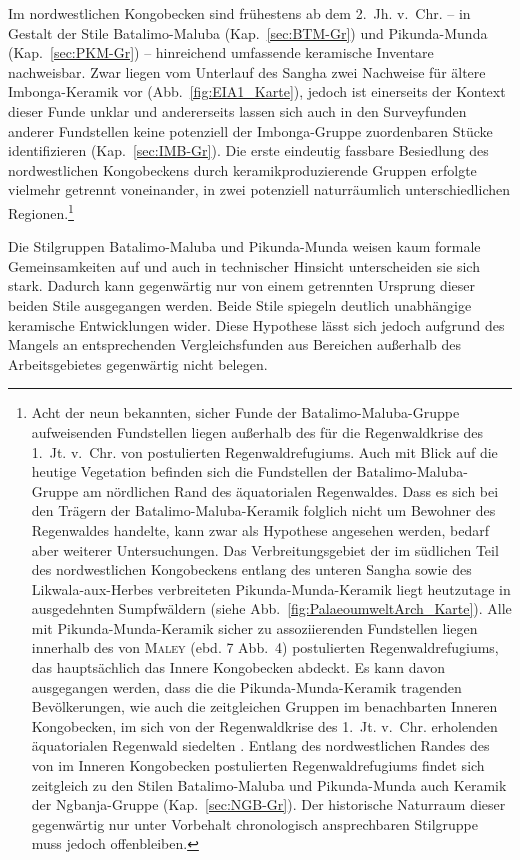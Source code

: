 Im nordwestlichen Kongobecken sind frühestens ab dem 2.~Jh. v.~Chr. -- in Gestalt der Stile Batalimo-Maluba (Kap.~\ref{sec:BTM-Gr}) und Pikunda-Munda (Kap.~\ref{sec:PKM-Gr}) -- hinreichend umfassende keramische Inventare nachweisbar. Zwar liegen vom Unterlauf des \mbox{Sangha} zwei Nachweise für ältere Imbonga-Keramik vor (Abb.~\ref{fig:EIA1_Karte}), jedoch ist einerseits der Kontext dieser Funde unklar und andererseits lassen sich auch in den Surveyfunden anderer Fundstellen keine potenziell der Imbonga-Gruppe zuordenbaren Stücke identifizieren (Kap.~\ref{sec:IMB-Gr}). Die erste eindeutig fassbare Besiedlung des nordwestlichen Kongobeckens durch keramikproduzierende Gruppen erfolgte vielmehr getrennt voneinander, in zwei potenziell naturräumlich unterschiedlichen Regionen.\footnote{Acht der neun bekannten, sicher Funde der Batalimo-Maluba-Gruppe aufweisenden Fundstellen liegen außerhalb des für die Regenwaldkrise des 1.~Jt. v.~Chr. von \textcite[7 Abb.~4]{Maley.2001} postulierten Regenwaldrefugiums. Auch mit Blick auf die heutige Vegetation befinden sich die Fundstellen der Batalimo-Maluba-Gruppe am nördlichen Rand des äquatorialen Regenwaldes. Dass es sich bei den Trägern der Batalimo-Maluba-Keramik folglich nicht um Bewohner des Regenwaldes handelte, kann zwar als Hypothese angesehen werden, bedarf aber weiterer Untersuchungen. Das Verbreitungsgebiet der im südlichen Teil des nordwestlichen Kongobeckens entlang des unteren \mbox{Sangha} sowie des \mbox{Likwala}-\mbox{aux}-\mbox{Herbes} verbreiteten Pikunda-Munda-Keramik liegt heutzutage in ausgedehnten Sumpfwäldern (siehe Abb.~\ref{fig:PalaeoumweltArch_Karte}). Alle mit Pikunda-Munda-Keramik sicher zu assoziierenden Fundstellen liegen innerhalb des von \textsc{Maley} (ebd. 7 Abb.~4) postulierten Regenwaldrefugiums, das hauptsächlich das Innere Kongobecken abdeckt. Es kann davon ausgegangen werden, dass die die Pikunda-Munda-Keramik tragenden Bevölkerungen, wie auch die zeitgleichen Gruppen im benachbarten Inneren Kongobecken, im sich von der Regenwaldkrise des 1.~Jt. v.~Chr. erholenden äquatorialen Regenwald siedelten \parencite[siehe][337]{Hubau.2013}. Entlang des nordwestlichen Randes des von \textcite{Maley.2001} im Inneren Kongobecken postulierten Regenwaldrefugiums findet sich zeitgleich zu den Stilen Batalimo-Maluba und Pikunda-Munda auch Keramik der \mbox{Ngbanja}-Gruppe (Kap.~\ref{sec:NGB-Gr}). Der historische Naturraum dieser gegenwärtig nur unter Vorbehalt chronologisch ansprechbaren Stilgruppe muss jedoch offenbleiben.}

Die Stilgruppen Batalimo-Maluba und Pikunda-Munda weisen kaum formale Gemeinsamkeiten auf und auch in technischer Hinsicht unterscheiden sie sich stark. Dadurch kann gegenwärtig nur von einem getrennten Ursprung dieser beiden Stile ausgegangen werden. Beide Stile spiegeln deutlich unabhängige keramische Entwicklungen wider. Diese Hypothese lässt sich jedoch aufgrund des Mangels an entsprechenden Vergleichsfunden aus Bereichen außerhalb des Arbeitsgebietes gegenwärtig nicht belegen.

